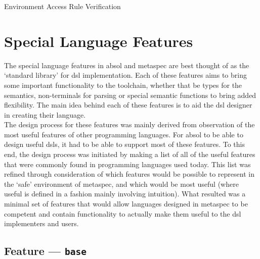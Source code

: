 \begin{algorithm}
\begin{algorithmic}
    \State
\end{algorithmic}
\caption{Environment Access Rule Verification}
\label{alg:environment_access_rule_verification}
\end{algorithm}




\section{Special Language Features} %
\label{sec:special_language_features}

The special language features in \gls{absol} and \gls{metaspec} are best thought of as the `standard library' for \gls{dsl} implementation.
Each of these features aims to bring some important functionality to the toolchain, whether that be types for the semantics, non-terminals for parsing or special semantic functions to bring added flexibility. 
The main idea behind each of these features is to aid the \gls{dsl} designer in creating their language. \\

The design process for these features was mainly derived from observation of the most useful features of other programming languages.
For \gls{absol} to be able to design useful \glspl{dsl}, it had to be able to support most of these features. 
To this end, the design process was initiated by making a list of all of the useful features that were commonly found in programming languages used today.
This list was refined through consideration of which features would be possible to represent in the `safe' environment of \gls{metaspec}, and which would be most useful (where useful is defined in a fashion mainly involving intuition).
What resulted was a minimal set of features that would allow languages designed in \gls{metaspec} to be competent and contain functionality to actually make them useful to the \gls{dsl} implementers and users. 

\subsection{Feature --- \texttt{base}} %
\label{sub:feature_base}

